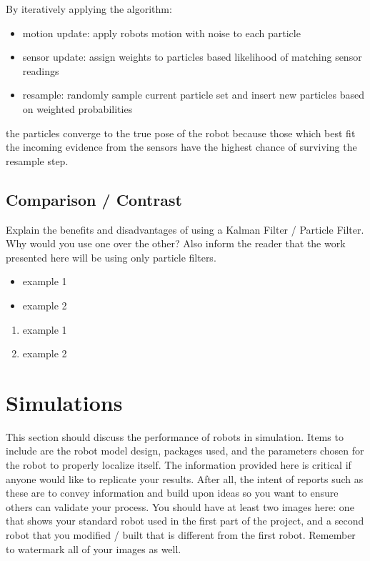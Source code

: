 \documentclass[10pt,journal,compsoc]{IEEEtran}
\begin{document}
By iteratively applying the algorithm:
\begin{itemize}      
      \item motion update: apply robots motion with noise to each particle
      \item sensor update: assign weights to particles based likelihood of matching sensor readings
      \item resample: randomly sample current particle set and insert new particles based on weighted probabilities
\end{itemize}
the particles converge to the true pose of the robot because those which best fit the incoming evidence from the sensors have the highest chance of surviving the resample step.


\subsection{Comparison / Contrast}
Explain the benefits and disadvantages of using a Kalman Filter / Particle Filter. Why would you use one over the other? Also inform the reader that the work presented here will be using only particle filters. 

\begin{itemize}
\item example 1
\item example 2
\end {itemize}

\begin{enumerate}
\item example 1
\item example 2
\end{enumerate}

\section{Simulations}
This section should discuss the performance of robots in simulation. Items to include are the robot model design, packages used, and the parameters chosen for the robot to properly localize itself. The information provided here is critical if anyone would like to replicate your results. After all, the intent of reports such as these are to convey information and build upon ideas so you want to ensure others can validate your process.
You should have at least two images here: one that shows your standard robot used in the first part of the project, and a second robot that you modified / built that is different from the first robot. Remember to watermark all of your images as well. 
\end{document}
